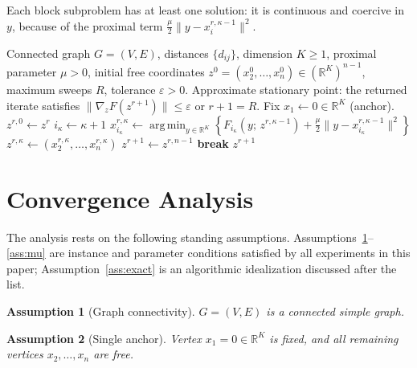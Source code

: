 \documentclass[11pt]{article}
\newtheorem{assumption}{Assumption}
\DeclareMathOperator*{\argmin}{arg\,min}
\begin{document}
Each block subproblem has at least one solution: it is continuous and coercive in \(y\), because of the proximal term \(\frac{\mu}{2}\|y-x_i^{r,\kappa-1}\|^2\).

\begin{algorithm}[ht]
\caption{Proximal Cyclic Block Coordinate Descent for Anchored Graph Realization}
\label{alg:prox-bcd}
\begin{algorithmic}[1]
\Require Connected graph $G=(V,E)$, distances $\{d_{ij}\}$, dimension $K\ge1$, proximal parameter $\mu>0$, initial free coordinates $z^0=(x_2^0,\ldots,x_n^0)\in(\mathbb{R}^K)^{n-1}$, maximum sweeps $R$, tolerance $\varepsilon>0$.
\Ensure Approximate stationary point: the returned iterate satisfies $\|\nabla_z F(z^{r+1})\|\le\varepsilon$ or $r+1=R$.
\State Fix $x_1 \leftarrow 0\in\mathbb{R}^K$ (anchor).
    \State $z^{r,0} \leftarrow z^r$
      
        \State $i_\kappa \leftarrow \kappa+1$
        \State $x_{i_\kappa}^{r,\kappa} \leftarrow \displaystyle\argmin_{y\in\mathbb{R}^K}\left\{F_{i_\kappa}(y;\,z^{r,\kappa-1})+\frac{\mu}{2}\|y-x_{i_\kappa}^{r,\kappa-1}\|^2\right\}$
        \State $z^{r,\kappa} \leftarrow (x_2^{r,\kappa},\ldots,x_n^{r,\kappa})$ 
    \EndFor
    \State $z^{r+1} \leftarrow z^{r,n-1}$
     \textbf{break} \EndIf
\EndFor
\State \Return $z^{r+1}$
\end{algorithmic}
\end{algorithm}

\section{Convergence Analysis}
\label{sec:convergence}

The analysis rests on the following standing assumptions.  Assumptions~\ref{ass:connected}--\ref{ass:mu} are instance and parameter conditions satisfied by all experiments in this paper; Assumption~\ref{ass:exact} is an algorithmic idealization discussed after the list.

\begin{assumption}[Graph connectivity]\label{ass:connected}
$G=(V,E)$ is a connected simple graph.
\end{assumption}

\begin{assumption}[Single anchor]\label{ass:anchor}
Vertex $x_1=0\in\mathbb{R}^K$ is fixed, and all remaining vertices $x_2,\ldots,x_n$ are free.
\end{assumption}
\end{document}
